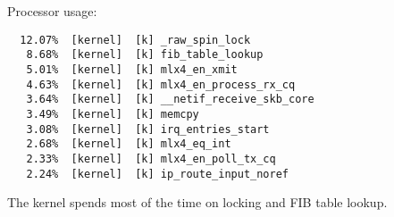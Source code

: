 Processor usage:
\begin{lstlisting}
  12.07%  [kernel]  [k] _raw_spin_lock
   8.68%  [kernel]  [k] fib_table_lookup
   5.01%  [kernel]  [k] mlx4_en_xmit
   4.63%  [kernel]  [k] mlx4_en_process_rx_cq
   3.64%  [kernel]  [k] __netif_receive_skb_core
   3.49%  [kernel]  [k] memcpy
   3.08%  [kernel]  [k] irq_entries_start
   2.68%  [kernel]  [k] mlx4_eq_int
   2.33%  [kernel]  [k] mlx4_en_poll_tx_cq
   2.24%  [kernel]  [k] ip_route_input_noref
\end{lstlisting}
The kernel spends most of the time on locking and FIB table lookup. 
